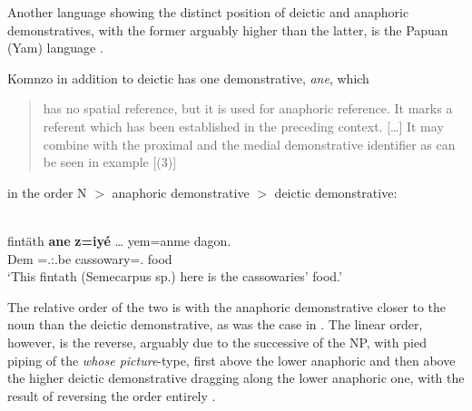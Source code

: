 \documentclass[output=paper]{langsci/langscibook}
\begin{document}
Another language showing the distinct  position of deictic and anaphoric
demonstratives, with the former arguably higher than the latter, is the Papuan
(Yam) language .

Komnzo in addition to deictic  has one demonstrative, \emph{ane},
which \blockquote[{\citealt[128f]{Dohler2016}}]{has no spatial reference, but
    it is used for anaphoric reference. It marks a referent which has been
    established in the preceding context. [\dots] It may combine with the
proximal and the medial demonstrative identifier as can be seen in example
[(3)]} in the order N $>$ anaphoric demonstrative $>$ deictic demonstrative:

\ea\label{ex:key:09.3}  \parencite[129]{Dohler2016}\\
    \gll fintäth \textbf{ane} \textbf{z=iyé} \dots{}  yem=anme  dagon.\\
        \Propn{}  Dem \Prox=\Tsg.\M:\Npst{}.be {} cassowary=\Poss.\Nsg{} food\\
	\glt ‘This fintath (Semecarpus sp.) here is the cassowaries’ food.’
\z

The relative order of the two is with the anaphoric demonstrative closer to the
noun than the deictic demonstrative, as was the case in .
The linear order, however, is the reverse, arguably due to the successive
 of the NP, with pied piping of the
\emph{whose picture}-type, first above the lower anaphoric and then above the
higher deictic demonstrative dragging along the lower anaphoric one,
with the result of reversing the order entirely
\parencite[cf.][]{Cinque2005,Cinque2017}.
\end{document}
